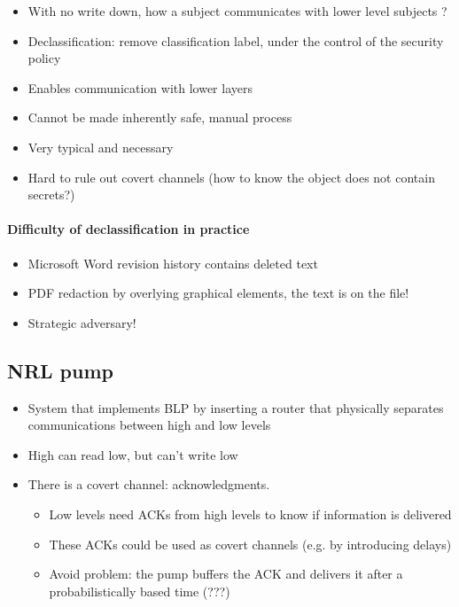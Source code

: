 \documentclass{article}
\newenvironment{myitemize}
{ \begin{itemize}
    \setlength{\itemsep}{005pt}
    \setlength{\parskip}{0pt}
    \setlength{\parsep}{0pt}     }
{ \end{itemize}                  }
\begin{document}
\begin{multicols}{2}
\begin{myitemize}
    \item With no write down, how a subject communicates with lower level subjects ?
    \item Declassification: remove classification label, under the control of the security policy
    \item Enables communication with lower layers
    \item Cannot be made inherently safe, manual process
    \item Very typical and necessary
    \item Hard to rule out covert channels (how to know the object does not contain secrets?)
\end{myitemize}


\paragraph{Difficulty of declassification in practice}

\begin{myitemize}
    \item Microsoft Word revision history contains deleted text
    \item PDF redaction by overlying graphical elements, the text is on the file!
    \item Strategic adversary!
\end{myitemize}

\subsection{NRL pump}

\begin{myitemize}
    \item System that implements BLP by inserting a router that physically separates communications between high and low levels 
    \item High can read low, but can't write low
    \item There is a covert channel: acknowledgments. 
    \begin{myitemize}
        \item Low levels need ACKs from high levels to know if information is delivered
        \item These ACKs could be used as covert channels (e.g. by introducing delays)
        \item Avoid problem: the pump buffers the ACK and delivers it after a probabilistically based time (???)
    \end{myitemize}
    

\end{myitemize}
\end{multicols}
\end{document}
